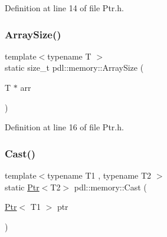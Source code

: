 Definition at line 14 of file Ptr.\+h.


\begin{DoxyCode}{0}

\end{DoxyCode}
\mbox{\label{namespacepdl_1_1memory_a6d676f3ba7ea07fb1dfb139a2969da2c}} 
\subsubsection{\texorpdfstring{ArraySize()}{ArraySize()}\hspace{0.1cm}{\footnotesize\ttfamily [3/3]}}
{\footnotesize\ttfamily template$<$typename T $>$ \\
static size\+\_\+t pdl\+::memory\+::\+Array\+Size (\begin{DoxyParamCaption}\item[{T $\ast$}]{arr }\end{DoxyParamCaption})\hspace{0.3cm}{\ttfamily [static]}}



Definition at line 16 of file Ptr.\+h.


\begin{DoxyCode}{0}

\end{DoxyCode}
\mbox{\label{namespacepdl_1_1memory_a74d0eeb5b9476036956160acf955f33d}} 
\subsubsection{\texorpdfstring{Cast()}{Cast()}}
{\footnotesize\ttfamily template$<$typename T1 , typename T2 $>$ \\
static \mbox{\hyperlink{classpdl_1_1memory_1_1_ptr}{Ptr}}$<$T2$>$ pdl\+::memory\+::\+Cast (\begin{DoxyParamCaption}\item[{\mbox{\hyperlink{classpdl_1_1memory_1_1_ptr}{Ptr}}$<$ T1 $>$}]{ptr }\end{DoxyParamCaption})\hspace{0.3cm}{\ttfamily [static]}}



